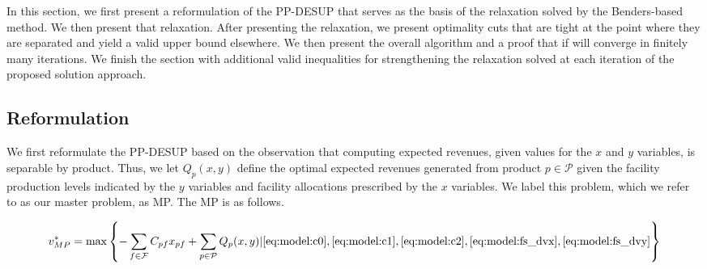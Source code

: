 \documentclass[12pt]{article}
\theoremstyle{thmstylethree}%
\begin{document}
In this section, we first present a reformulation of the PP-DESUP that serves as the basis of the relaxation solved by the Benders-based method. We then present that relaxation. After presenting the relaxation, we present optimality cuts that are tight at the point where they are separated and yield a valid upper bound elsewhere. We then present the overall algorithm and a proof that if will converge in finitely many iterations. We finish the section with additional valid inequalities for strengthening the relaxation solved at each iteration of the proposed solution approach.

\subsection{Reformulation}
\label{subsec:mp}
We first reformulate the PP-DESUP based on the observation that computing expected revenues, given values for the $x$ and $y$ variables, is separable by product. Thus, we let $Q_{p}(x,y)$ define the optimal expected revenues generated from product $p \in \mathcal{P}$ given the facility production levels indicated by the $y$ variables and facility allocations prescribed by the $x$ variables. We label this problem, which we refer to as our master problem, as MP. The MP is as follows.


\begin{align}\label{eq:mpv1}
  v_{MP}^{*} = \max  \left\{- \sum_{f \in \mathcal{F}} C_{pf}x_{pf} + \sum_{p \in \mathcal{P}} Q_{p}(x,y) \vert  \eqref{eq:model:c0},\eqref{eq:model:c1},\eqref{eq:model:c2},\eqref{eq:model:fs_dvx},\eqref{eq:model:fs_dvy}\right\}
\end{align}
\end{document}
